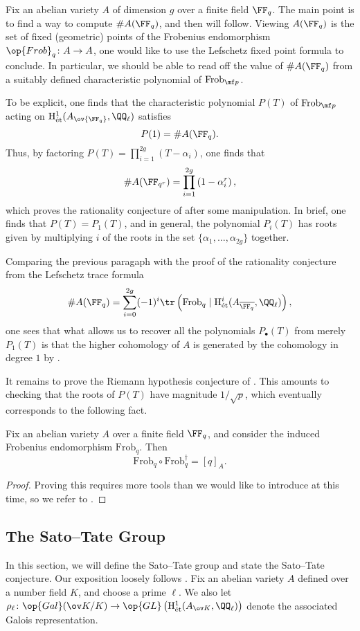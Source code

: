 \documentclass[../thesis.tex]{subfiles}
\begin{document}
Fix an abelian variety $A$ of dimension $g$ over a finite field $\FF_q$. The main point is to find a way to compute $\#A(\FF_q)$, and then  will follow. Viewing $A(\FF_q)$ is the set of fixed (geometric) points of the Frobenius endomorphism $\op{Frob}_q\colon A\to A$, one would like to use the Lefschetz fixed point formula to conclude. In particular, we should be able to read off the value of $\#A(\FF_q)$ from a suitably defined characteristic polynomial of $\mathrm{Frob}_{\mf p}$.

To be explicit, one finds that the characteristic polynomial $P(T)$ of $\mathrm{Frob}_{\mf p}$ acting on $\mathrm H^1_{\mathrm{\acute et}}(A_{\ov{\FF_q}},\QQ_\ell)$ satisfies
\[P(1)=\#A(\FF_q).\]
Thus, by factoring $P(T)=\prod_{i=1}^{2g}(T-\alpha_i)$, one finds that
\[\#A(\FF_{q^r})=\prod_{i=1}^{2g}\left(1-\alpha_i^r\right),\]
which proves the rationality conjecture of  after some manipulation. In brief, one finds that $P(T)=P_1(T)$, and in general, the polynomial $P_i(T)$ has roots given by multiplying $i$ of the roots in the set $\{\alpha_1,\ldots,\alpha_{2g}\}$ together.
\begin{remark}
	Comparing the previous paragaph with the proof of the rationality conjecture from the Lefschetz trace formula
	\[\#A(\FF_q)=\sum_{i=0}^{2g}(-1)^i\tr\left(\mathrm{Frob}_q\mid\mathrm H^i_{\mathrm{\acute et}}(A_{\overline{\FF_q}},\QQ_\ell)\right),\]
	one sees that what allows us to recover all the polynomials $P_\bullet(T)$ from merely $P_1(T)$ is that the higher cohomology of $A$ is generated by the cohomology in degree $1$ by .
\end{remark}
It remains to prove the Riemann hypothesis conjecture of . This amounts to checking that the roots of $P(T)$ have magnitude $1/\sqrt p$, which eventually corresponds to the following fact.
\begin{proposition} \label{prop:frob-multiplier}
	Fix an abelian variety $A$ over a finite field $\FF_q$, and consider the induced Frobenius endomorphism $\mathrm{Frob}_q$. Then
	\[\mathrm{Frob}_q\circ\mathrm{Frob}_q^\dagger=[q]_A.\]
\end{proposition}
\begin{proof}
	Proving this requires more tools than we would like to introduce at this time, so we refer to \cite[Lemma~III.1.2]{milne-av}.
\end{proof}

\subsection{The Sato--Tate Group}
In this section, we will define the Sato--Tate group and state the Sato--Tate conjecture. Our exposition loosely follows \cite{sutherland-sato-tate}. Fix an abelian variety $A$ defined over a number field $K$, and choose a prime $\ell$. We also let $\rho_\ell\colon\op{Gal}(\ov K/K)\to\op{GL}\left(\mathrm H^1_{\mathrm{\acute et}}(A_{\ov K},\QQ_\ell)\right)$ denote the associated Galois representation.
\end{document}
